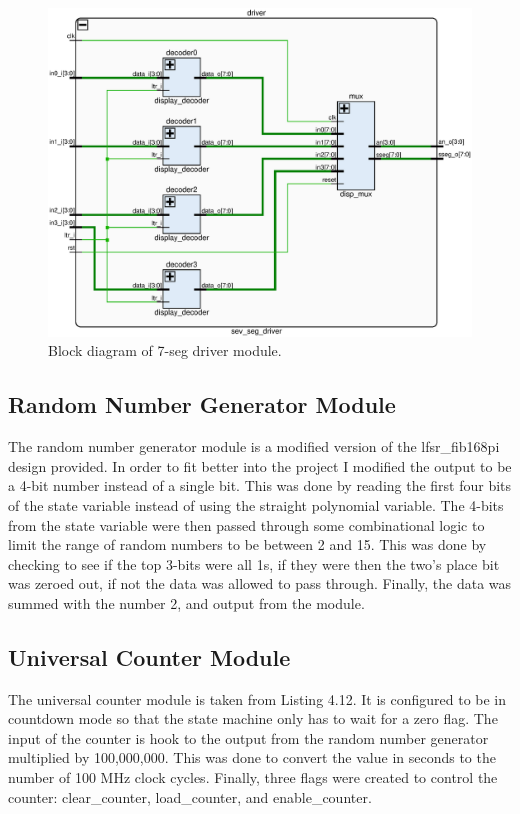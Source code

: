 \documentclass[11pt]{article}
\begin{document}
\begin{figure}[H]
	\includegraphics [width=5in]{display_driver.eps}
	\centering
	\caption{Block diagram of 7-seg driver module.}
	\label{fig:7SegDriver}
\end{figure}


\subsection{Random Number Generator Module}
The random number generator module is a modified version of the lfsr\_fib168pi design provided. In order to fit better into the project I modified the output to be a 4-bit number instead of a single bit. This was done by reading the first four bits of the state variable instead of using the straight polynomial variable. The 4-bits from the state variable were then passed through some combinational logic to limit the range of random numbers to be between 2 and 15. This was done by checking to see if the top 3-bits were all 1s, if they were then the two's place bit was zeroed out, if not the data was allowed to pass through. Finally, the data was summed with the number 2, and output from the module.

\subsection{Universal Counter Module}
The universal counter module is taken from Listing 4.12. It is configured to be in countdown mode so that the state machine only has to wait for a zero flag. The input of the counter is hook to the output from the random number generator multiplied by 100,000,000. This was done to convert the value in seconds to the number of 100 MHz clock cycles. Finally, three flags were created to control the counter: clear\_counter, load\_counter, and enable\_counter.
\end{document}
